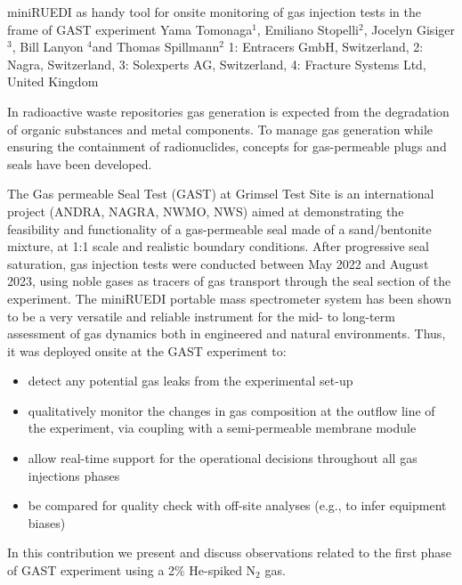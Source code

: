 \begin{conf-abstract}
{miniRUEDI as handy tool for onsite monitoring of gas injection tests in the frame of GAST experiment}
{Yama Tomonaga$^1$, Emiliano Stopelli$^2$, Jocelyn Gisiger$^3$, Bill Lanyon $^4$and Thomas Spillmann$^2$}
{1: Entracers GmbH, Switzerland, 2: Nagra, Switzerland, 3: Solexperts AG, Switzerland, 4: Fracture Systems Ltd, United Kingdom}
{In radioactive waste repositories gas generation is expected from the degradation of organic substances and metal components. To manage gas generation while ensuring the containment of radionuclides, concepts for gas-permeable plugs and seals have been developed.

The Gas permeable Seal Test (GAST) at Grimsel Test Site is an international project (ANDRA, NAGRA, NWMO, NWS) aimed at demonstrating the feasibility and functionality of a gas-permeable seal made of a sand/bentonite mixture, at 1:1 scale and realistic boundary conditions. After progressive seal saturation, gas injection tests were conducted between May 2022 and August 2023, using noble gases as tracers of gas transport through the seal section of the experiment.
The miniRUEDI portable mass spectrometer system has been shown to be a very versatile and reliable instrument for the mid- to long-term assessment of gas dynamics both in engineered and natural environments. Thus, it was deployed onsite at the GAST experiment to:
\begin{itemize}
\item detect any potential gas leaks from the experimental set-up
\item qualitatively monitor the changes in gas composition at the outflow line of the experiment, via coupling with a semi-permeable membrane module
\item allow real-time support for the operational decisions throughout all gas injections phases 
\item be compared for quality check with off-site analyses (e.g., to infer equipment biases)
\end{itemize}
In this contribution we present and discuss observations related to the first phase of GAST experiment using a 2\% He-spiked N$_2$ gas.}
\end{conf-abstract}



